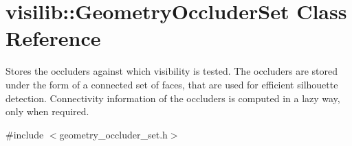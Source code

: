 \hypertarget{classvisilib_1_1_geometry_occluder_set}{}\section{visilib\+::Geometry\+Occluder\+Set Class Reference}
\label{classvisilib_1_1_geometry_occluder_set}


Stores the occluders against which visibility is tested. The occluders are stored under the form of a connected set of faces, that are used for efficient silhouette detection. Connectivity information of the occluders is computed in a lazy way, only when required. 




{\ttfamily \#include $<$geometry\+\_\+occluder\+\_\+set.\+h$>$}

